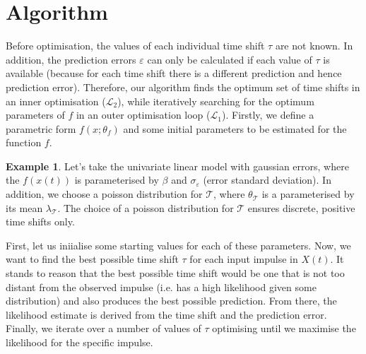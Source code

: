 \documentclass[11pt]{amsart}
\theoremstyle{definition}
\newtheorem*{example}{Example}
\theoremstyle{definition}
\begin{document}
\section{Algorithm}

Before optimisation, the values of each individual time shift $\tau$ are not known. In addition, the prediction errors $\varepsilon$ can only be calculated if each value of $\tau$ is available (because for each time shift there is a different prediction and hence prediction error). Therefore, our algorithm finds the optimum set of time shifts in an inner optimisation ($\mathcal{L}_2$), while iteratively searching for the optimum parameters of $f$ in an outer optimisation loop ($\mathcal{L}_1$). 
Firstly, we define a parametric form $f(x;\theta_f)$ and some initial parameters to be estimated for the function $f$. 

\begin{example}\label{example:poisson}
Let's take the univariate linear model with gaussian errors, where the $f(x(t))$ is parameterised by $\beta$ and $\sigma_{\varepsilon}$ (error standard deviation). In addition, we choose a poisson distribution for $\mathcal{T}$, where $\theta_{\mathcal{T}}$ is a parameterised by its mean $\lambda_{\mathcal{T}}$. The choice of a poisson distribution for $\mathcal{T}$
ensures discrete, positive time shifts only.
\end{example}


First, let us iniialise some starting values for each of these parameters. Now, we want to find the best possible time shift $\tau$ for each input impulse in $X(t)$. It stands to reason that the best possible time shift would be one that is not too distant from the observed impulse (i.e. has a high likelihood given some distribution) and also produces the best possible prediction. From there, the likelihood estimate is derived from the time shift and the prediction error.
Finally, we iterate over a number of values of $\tau$ optimising until we maximise the likelihood for the specific impulse.
\end{document}
